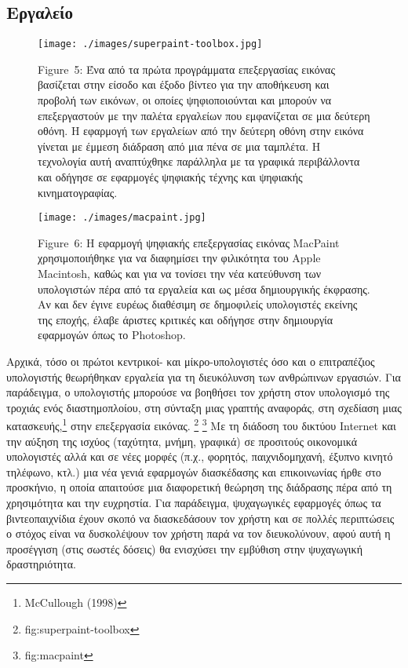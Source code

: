 \documentclass[
]{article}
\begin{document}
\hypertarget{ux3b5ux3c1ux3b3ux3b1ux3bbux3b5ux3afux3bf}{%
\subsection{Εργαλείο}\label{ux3b5ux3c1ux3b3ux3b1ux3bbux3b5ux3afux3bf}}

\leavevmode{}%
\begin{figure}
\hypertarget{fig:superpaint-toolbox}{%
\centering
\texttt{[image: ./images/superpaint-toolbox.jpg]}
\caption{Figure~5: Ένα από τα πρώτα προγράμματα επεξεργασίας εικόνας
βασίζεται στην είσοδο και έξοδο βίντεο για την αποθήκευση και προβολή
των εικόνων, οι οποίες ψηφιοποιούνται και μπορούν να επεξεργαστούν με
την παλέτα εργαλείων που εμφανίζεται σε μια δεύτερη οθόνη. Η εφαρμογή
των εργαλείων από την δεύτερη οθόνη στην εικόνα γίνεται με έμμεση
διάδραση από μια πένα σε μια ταμπλέτα. Η τεχνολογία αυτή αναπτύχθηκε
παράλληλα με τα γραφικά περιβάλλοντα και οδήγησε σε εφαρμογές ψηφιακής
τέχνης και ψηφιακής κινηματογραφίας.}\label{fig:superpaint-toolbox}
}
\end{figure}

\leavevmode{}%
\begin{figure}
\hypertarget{fig:macpaint}{%
\centering
\texttt{[image: ./images/macpaint.jpg]}
\caption{Figure~6: Η εφαρμογή ψηφιακής επεξεργασίας εικόνας MacPaint
χρησιμοποιήθηκε για να διαφημίσει την φιλικότητα του Apple Macintosh,
καθώς και για να τονίσει την νέα κατεύθυνση των υπολογιστών πέρα από τα
εργαλεία και ως μέσα δημιουργικής έκφρασης. Αν και δεν έγινε ευρέως
διαθέσιμη σε δημοφιλείς υπολογιστές εκείνης της εποχής, έλαβε άριστες
κριτικές και οδήγησε στην δημιουργία εφαρμογών όπως το
Photoshop.}\label{fig:macpaint}
}
\end{figure}

Αρχικά, τόσο οι πρώτοι κεντρικοί- και μίκρο-υπολογιστές όσο και ο
επιτραπέζιος υπολογιστής θεωρήθηκαν εργαλεία για τη διευκόλυνση των
ανθρώπινων εργασιών. Για παράδειγμα, ο υπολογιστής μπορούσε να βοηθήσει
τον χρήστη στον υπολογισμό της τροχιάς ενός διαστημοπλοίου, στη σύνταξη
μιας γραπτής αναφοράς, στη σχεδίαση μιας κατασκευής,\footnote{McCullough
  (1998)} στην επεξεργασία εικόνας. \footnote{fig:superpaint-toolbox}
\footnote{fig:macpaint} Με τη διάδοση του δικτύου Internet και την
αύξηση της ισχύος (ταχύτητα, μνήμη, γραφικά) σε προσιτούς οικονομικά
υπολογιστές αλλά και σε νέες μορφές (π.χ., φορητός, παιχνιδομηχανή,
έξυπνο κινητό τηλέφωνο, κτλ.) μια νέα γενιά εφαρμογών διασκέδασης και
επικοινωνίας ήρθε στο προσκήνιο, η οποία απαιτούσε μια διαφορετική
θεώρηση της διάδρασης πέρα από τη χρησιμότητα και την ευχρηστία. Για
παράδειγμα, ψυχαγωγικές εφαρμογές όπως τα βιντεοπαιχνίδια έχουν σκοπό να
διασκεδάσουν τον χρήστη και σε πολλές περιπτώσεις ο στόχος είναι να
δυσκολέψουν τον χρήστη παρά να τον διευκολύνουν, αφού αυτή η προσέγγιση
(στις σωστές δόσεις) θα ενισχύσει την εμβύθιση στην ψυχαγωγική
δραστηριότητα.
\end{document}
